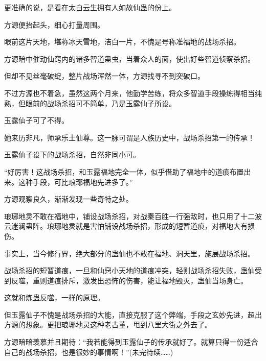 \begin{this_body}
更准确的说，是看在太白云生拥有人如故仙蛊的份上。

方源便抬起头，细心打量周围。

眼前这片天地，堪称冰天雪地，洁白一片，不愧是号称准福地的战场杀招。

方源暗中催动仙窍内的诸多智道蛊虫，当着众人的面，使出好些智道侦察杀招。

但却不见丝毫破绽，整片战场浑然一体，方源找寻不到突破口。

不过方源也不着急，虽然这两个月来，他勤学苦练，将众多智道手段操练得相当纯熟，但眼前的战场杀招可不简单，乃是玉露仙子所设。

玉露仙子可了不得。

她来历非凡，师承乐土仙尊。这一脉可谓是人族历史中，战场杀招第一的传承！

玉露仙子设下的战场杀招，自然非同小可。

“好厉害！这战场杀招，和玉露福地完全一体，似乎借助了福地中的道痕布置出来。这种手段，可比琅琊福地先进多了。”

方源观察良久，渐渐发现一些奇特之处。

琅琊地灵不敢在福地中，铺设战场杀招，对战秦百胜一行强敌时，也只用了十二波云迷澜蛊阵。琅琊地灵就是害怕铺设战场杀招，形成的短暂道痕，对福地大有损伤。

事实上，当今修行界，绝大部分的蛊仙也不敢在福地、洞天里，施展战场杀招。

战场杀招的短暂道痕，一旦和仙窍小天地的道痕冲突，轻则战场杀招失败，蛊仙受到反噬，重则道痕排斥，激发出恐怖的伤害，能让福地毁灭，蛊仙当场身亡。

这就和炼蛊反噬，一样的原理。

但玉露仙子不愧是战场杀招的大能，直接克服了这个弊端，手段之玄妙先进，超出方源的想象。更把琅琊地灵这种老古董，甩到八里大街之外去了。

方源暗暗羡慕并且期待：“我若能得到玉露仙子的传承就好了。就算只得一份适合自己的战场杀招，也是很妙的事情啊！”(未完待续……)

\end{this_body}

